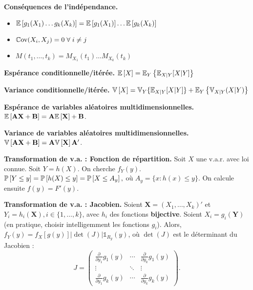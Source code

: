\textbf{Conséquences de l'indépendance.} 
\begin{itemize}
	\item $\mathbb{E}\left[{g_1(X_1)\dots g_k(X_k)}\right] = \mathbb{E}\left[{g_1(X_1)}\right] \dots \mathbb{E}\left[{g_k(X_k)}\right]$ 
	\item $\mathbb{C}\text{ov}(X_i,X_j) = 0 \; \forall \; i \ne j$
	\item $ M(t_1, \dots, t_k) = M_{X_1}(t_1) \dots M_{X_k}(t_k)$
\end{itemize}

\textbf{Espérance conditionnelle/itérée.} $\mathbb{E}\left[{X}\right] = \mathbb{E}_Y \left\{ \mathbb{E}_{X|Y}[X|Y] \right\}$

\textbf{Variance conditionnelle/itérée.} $\mathbb{V}\left[{X}\right] = \mathbb{V}_Y \{ \mathbb{E}_{X|Y}[X|Y] \} + \mathbb{E}_Y \left\{ \mathbb{V}_{X|Y}(X|Y) \right\}$

\textbf{Espérance de variables aléatoires multidimensionnelles.} $\mathbb{E}\left[{\mathbf{A} \mathbf{X} + \mathbf{B}}\right] = \mathbf{A}\mathbb{E}\left[{\mathbf{X}}\right] + \mathbf{B}$.

\textbf{Variance de variables aléatoires multidimensionnelles.} $\mathbb{V}\left[{\mathbf{A} \mathbf{X} + \mathbf{B}}\right] = \mathbf{A}\mathbb{V}\left[{\mathbf{X}}\right]\mathbf{A}'$.

\textbf{Transformation de v.a. : Fonction de répartition.} Soit $X$ une v.a.r. avec loi connue. Soit $Y= h(X)$. On cherche $f_Y(y)$. $\mathbb{P}\left[{Y \le y}\right] = \mathbb{P}\left[{h(X) \le y}\right] = \mathbb{P}\left[{X \le A_y}\right],$ où $A_y=\{x:h(x)\le y\}$. On calcule ensuite $f(y) = F'(y)$.


\textbf{Transformation de v.a. : Jacobien.} Soient $\mathbf{X} = (X_1, \dots, X_k)'$ et $Y_i= h_i(\mathbf{X}), i \in \{1,\dots,k\}$, avec $h_i$ des fonctions \textbf{bijective}. Soient $X_i = g_i(\mathbf{Y})$ (en pratique, choisir intelligemment les fonctions $g_i$). Alors, $f_Y(y) = f_X\left[g(y)\right]|\det(J)|\mathds{1}_{R_y}(y)$, où $\det(J)$ est le déterminant du Jacobien :
\begin{equation}
	J = 
	\begin{pmatrix}
		\frac{\partial}{\partial y_1}g_1(y) & \cdots & \frac{\partial}{\partial y_k}g_1(y)\\
		\vdots & \ddots & \vdots \\
		\frac{\partial}{\partial y_1}g_k(y) & \cdots& \frac{\partial}{\partial y_k}g_k(y)
	\end{pmatrix}.
\end{equation}

